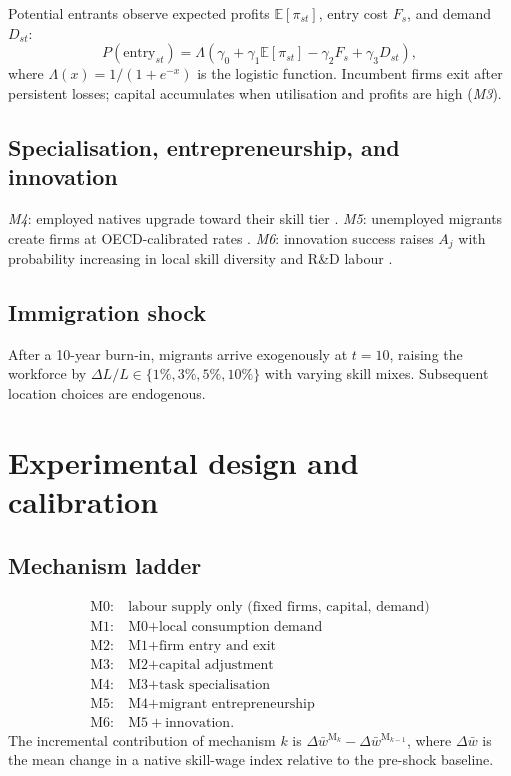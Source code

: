 \documentclass[11pt,a4paper]{article}
\begin{document}
Potential entrants observe expected profits $\mathbb{E}[\pi_{st}]$, entry cost $F_s$, and demand $D_{st}$:
\begin{equation}
  \label{eq:entry}
  P(\text{entry}_{st}) =
  \Lambda\!\left(
    \gamma_0 + \gamma_1 \mathbb{E}[\pi_{st}] - \gamma_2 F_s + \gamma_3 D_{st}
  \right),
\end{equation}
where $\Lambda(x)=1/(1+e^{-x})$ is the logistic function.
Incumbent firms exit after persistent losses; capital accumulates when utilisation and profits are high (\emph{M3}).

\subsection{Specialisation, entrepreneurship, and innovation}

\emph{M4}: employed natives upgrade toward their skill tier \citep{peri2009}.
\emph{M5}: unemployed migrants create firms at OECD-calibrated rates \citep{oecd2024entrepreneurship}.
\emph{M6}: innovation success raises $A_j$ with probability increasing in local skill diversity and R\&D labour \citep{terry2026}.

\subsection{Immigration shock}

After a 10-year burn-in, migrants arrive exogenously at $t=10$, raising the workforce by $\Delta L/L \in \{1\%, 3\%, 5\%, 10\%\}$ with varying skill mixes.
Subsequent location choices are endogenous.

\section{Experimental design and calibration}
\label{sec:design}

\subsection{Mechanism ladder}

\begin{align*}
  \text{M0}: & \ \text{labour supply only (fixed firms, capital, demand)} \\
  \text{M1}: & \ \text{M0} + \text{local consumption demand} \\
  \text{M2}: & \ \text{M1} + \text{firm entry and exit} \\
  \text{M3}: & \ \text{M2} + \text{capital adjustment} \\
  \text{M4}: & \ \text{M3} + \text{task specialisation} \\
  \text{M5}: & \ \text{M4} + \text{migrant entrepreneurship} \\
  \text{M6}: & \ \text{M5} + \text{innovation}.
\end{align*}
The incremental contribution of mechanism $k$ is $\Delta \bar{w}^{\text{M}_k} - \Delta \bar{w}^{\text{M}_{k-1}}$, where $\Delta \bar{w}$ is the mean change in a native skill-wage index relative to the pre-shock baseline.
\end{document}
